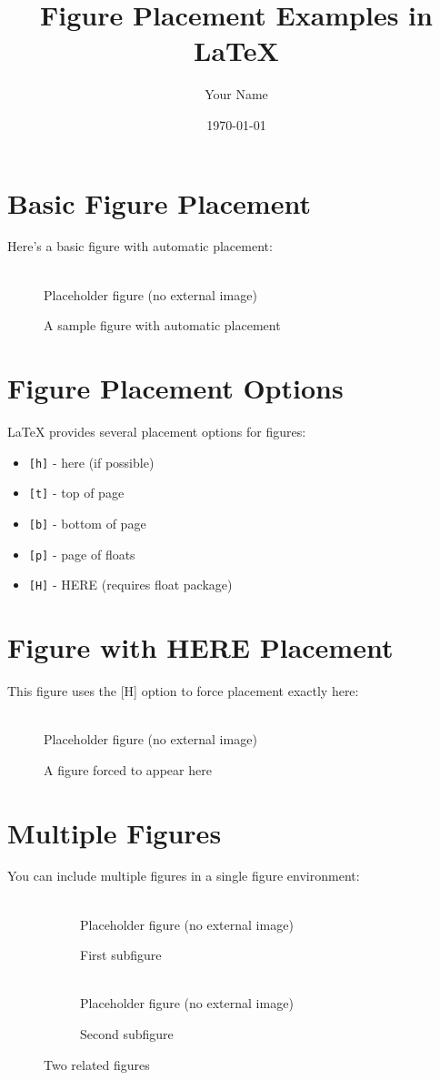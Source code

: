 \documentclass{article}
\title{Figure Placement Examples in LaTeX}
\author{Your Name}
\date{\today}
\newcommand{\placeholder}[2][0.6\\textwidth]{%
  \begin{minipage}{#1}
    \centering
    \fbox{\rule{0pt}{#2}\rule{#1}{0pt}}\\[0.5em]
    \small Placeholder figure (no external image)
  \end{minipage}
}
\begin{document}
\maketitle

\section{Basic Figure Placement}
Here's a basic figure with automatic placement:

\begin{figure}[h]
\centering
\placeholder[0.6\textwidth]{120pt}
\caption{A sample figure with automatic placement}
\label{fig:sample}
\end{figure}

\section{Figure Placement Options}
LaTeX provides several placement options for figures:

\begin{itemize}
    \item \texttt{[h]} - here (if possible)
    \item \texttt{[t]} - top of page
    \item \texttt{[b]} - bottom of page
    \item \texttt{[p]} - page of floats
    \item \texttt{[H]} - HERE (requires float package)
\end{itemize}

\section{Figure with HERE Placement}
This figure uses the [H] option to force placement exactly here:

\begin{figure}[H]
\centering
\placeholder[0.5\textwidth]{100pt}
\caption{A figure forced to appear here}
\label{fig:here}
\end{figure}

\section{Multiple Figures}
You can include multiple figures in a single figure environment:

\begin{figure}[h]
\centering
\begin{subfigure}{0.45\textwidth}
    \centering
    \placeholder[\textwidth]{90pt}
    \caption{First subfigure}
    \label{fig:sub1}
\end{subfigure}
\hfill
\begin{subfigure}{0.45\textwidth}
    \centering
    \placeholder[\textwidth]{90pt}
    \caption{Second subfigure}
    \label{fig:sub2}
\end{subfigure}
\caption{Two related figures}
\label{fig:multiple}
\end{figure}
\end{document}
